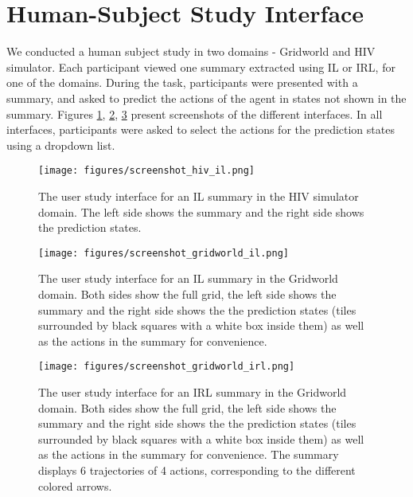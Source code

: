 \documentclass{article}
\begin{document}
\section{Human-Subject Study Interface}
We conducted a human subject study in two domains - Gridworld and HIV simulator. Each participant viewed one summary extracted using IL or IRL, for one of the domains. During the task, participants were presented with a summary, and asked to predict the actions of the agent in states not shown in the summary. Figures \ref{fig:interface_hiv_il}, \ref{fig:interface_gridworld_il}, \ref{fig:interface_gridworld_irl} present screenshots of the different interfaces. In all interfaces, participants were asked to select the actions for the prediction states using a dropdown list. 

\begin{figure}[H]
\centering
\texttt{[image: figures/screenshot\_hiv\_il.png]}
\caption{The user study interface for an IL summary in the HIV simulator domain. The left side shows the summary and the right side shows the prediction states.}
\label{fig:interface_hiv_il}
\vspace{-0.2cm}
\end{figure}

\begin{figure}[H]
\centering
\texttt{[image: figures/screenshot\_gridworld\_il.png]}
\caption{The user study interface for an IL summary in the Gridworld domain. Both sides show the full grid, the left side shows the summary and the right side shows the the prediction states (tiles surrounded by black squares with a white box inside them) as well as the actions in the summary for convenience.}
\label{fig:interface_gridworld_il}
\vspace{-0.2cm}
\end{figure}

\begin{figure}[H]
\centering
\texttt{[image: figures/screenshot\_gridworld\_irl.png]}
\caption{The user study interface for an IRL summary in the Gridworld domain. Both sides show the full grid, the left side shows the summary and the right side shows the the prediction states (tiles surrounded by black squares with a white box inside them) as well as the actions in the summary for convenience. The summary displays 6 trajectories of 4 actions, corresponding to the different colored arrows.}
\label{fig:interface_gridworld_irl}
\vspace{-0.2cm}
\end{figure}
\end{document}
